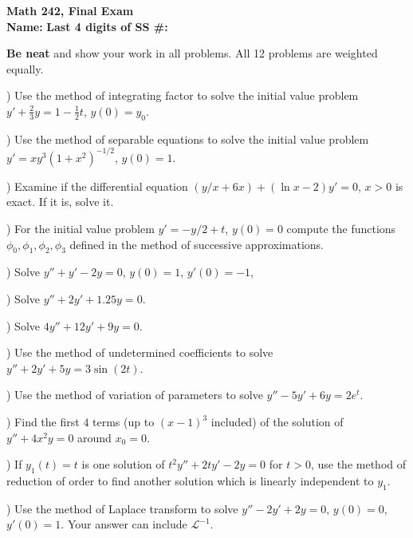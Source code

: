 \documentclass[12pt]{amsart}
\begin{document}
\noindent
{\bf Math 242, Final Exam}\\
{\bf  Name:} \hskip 3in {\bf Last 4 digits of SS \#:}

\noindent
{\bf Be neat} and show your work in all problems. All 12 problems are weighted
equally.


) Use the method of integrating factor to solve the initial value problem 
$y'+ \frac{2}{3}y= 1 - \frac{1}{2}t$, $y(0)=y_0$. 



) Use the method of separable equations to solve the initial value problem 
$y'=xy^3(1+x^2)^{-1/2}$, $y(0)=1$.

) Examine if the differential equation $(y/x +6x) + (\ln x -2)y'=0$, $x>0$ is exact. If it is,
solve it.


) For the initial value problem $y'=-y/2+t$, $y(0)=0$ compute the functions
$\phi_0, \phi_1, \phi_2, \phi_3$ defined in the method of successive approximations.



) Solve $y''+y'-2y=0$, $y(0)=1$, $y'(0)=-1$,


) Solve $y''+2y'+1.25y=0$.


) Solve $4y''+12y'+9y=0$.


) Use the method of undetermined coefficients to solve $y''+2y'+5y=3 \sin (2t)$.


) Use the method of variation of parameters to solve $y''-5y'+6y=2e^t$.




) Find the first $4$ terms (up to $(x-1)^3$ included) of the solution of $y''+4x^2y=0$ around 
$x_0=0$.



) If $y_1(t)=t$ is one solution of $t^2y''+2ty'-2y=0$ for $t>0$, use the method of reduction of 
order to find another solution
which is linearly independent to $y_1$.

) Use the method of Laplace transform to solve $y''-2y'+2y=0$, $y(0)=0$, $y'(0)=1$. Your answer
can include ${\mathcal L}^{-1}$. 
\end{document}
